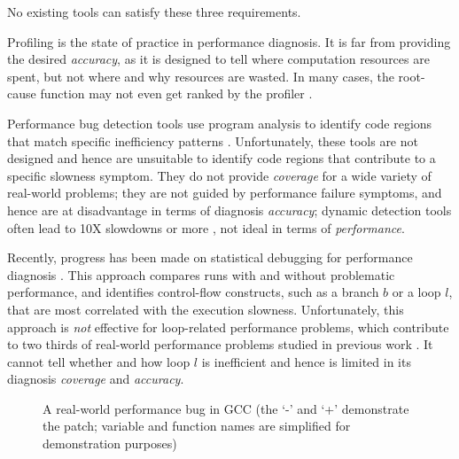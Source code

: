 No existing tools can satisfy these
three requirements.

Profiling is the state of practice in performance diagnosis.
It is far from providing the desired \textit{accuracy}, as it is designed to
tell where computation resources are spent, 
but not where and why resources are wasted. 
In many cases, the root-cause function may not even
get ranked by the profiler \cite{SongOOPSLA2014}.

Performance bug detection tools use program analysis to identify
code regions that match specific inefficiency patterns 
\cite{Alabama,CARAMEL, Cachetor,Xu:2010:FLD:1806596.1806617,Dufour:2008:STC:1453101.1453111, Xu:2009:GFP:1542476.1542523, Xu:2010:DIC:1806596.1806616,IsilDillig.PLDI15}. 
Unfortunately, these tools are not designed and hence are unsuitable
to identify code regions that contribute to a specific slowness symptom.
They do not provide \textit{coverage} for a wide
variety of real-world problems; they are not guided by
performance failure symptoms, and hence are at disadvantage in terms of diagnosis
\textit{accuracy}; dynamic detection tools often lead to 
10X slowdowns or more \cite{Cachetor,Xu:2010:FLD:1806596.1806617,Alabama}, 
not ideal in terms of \textit{performance}.

Recently, progress has been made on statistical debugging for
performance diagnosis \cite{SongOOPSLA2014}.
This approach compares runs with and without problematic performance, and
identifies control-flow constructs, such as a branch $b$ or 
a loop $l$, that are most correlated with
the execution slowness.
Unfortunately, this approach is \textit{not} effective
for loop-related 
performance problems, which contribute to two thirds of
real-world performance problems studied in previous work 
\cite{SongOOPSLA2014,PerfBug}. It cannot
tell whether and how loop $l$ is inefficient 
and hence is limited in its diagnosis \textit{coverage} and \textit{accuracy}.

\begin{figure}
\centering
{}
  \mbox{}
\caption{A real-world performance bug in GCC (the `-' and `+' demonstrate the patch; variable and 
function names are simplified for demonstration purposes)}
\label{fig:GCC27733}
\end{figure}

